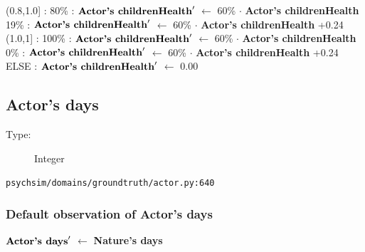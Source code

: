 \documentclass{article}%
\begin{document}
\begin{flushleft}
\hspace*{4em}%
(0.8,1.0{]}%
: %
\linebreak%
\hspace*{6em}%
80\%%
: %
$\mbox{\textbf{Actor's childrenHealth}} '$%
$\leftarrow$%
60\%%
$\cdot$%
\textbf{Actor's childrenHealth}%
\linebreak%
\hspace*{6em}%
19\%%
: %
$\mbox{\textbf{Actor's childrenHealth}} '$%
$\leftarrow$%
60\%%
$\cdot$%
\textbf{Actor's childrenHealth}%
+0.24%
\linebreak%
\hspace*{4em}%
(1.0,1{]}%
: %
\linebreak%
\hspace*{6em}%
100\%%
: %
$\mbox{\textbf{Actor's childrenHealth}} '$%
$\leftarrow$%
60\%%
$\cdot$%
\textbf{Actor's childrenHealth}%
\linebreak%
\hspace*{6em}%
0\%%
: %
$\mbox{\textbf{Actor's childrenHealth}} '$%
$\leftarrow$%
60\%%
$\cdot$%
\textbf{Actor's childrenHealth}%
+0.24%
\linebreak%
\hspace*{2em}%
ELSE %
: %
$\mbox{\textbf{Actor's childrenHealth}} '$%
$\leftarrow$%
0.00%
\end{flushleft}

%
\subsection{Actor's days}%
\label{subsec:Actor's days}%
\begin{description}%
\item[Type:]%
Integer%
\end{description}%
\begin{flushleft}%
\verb|psychsim/domains/groundtruth/actor.py:640|%
\end{flushleft}%
\subsubsection{Default observation of Actor's days}%
\label{ssubsec:Default observation of Actor's days}%
\begin{flushleft}%
$\mbox{\textbf{Actor's days}} '$%
$\leftarrow$%
\textbf{Nature's days}%
\end{flushleft}

%
\end{document}
